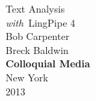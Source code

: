 \cleardoublepage
\pagestyle{empty}
\vspace*{1in}
\begin{center}
{\hfill \fontsize{45}{65}\selectfont Text Analysis \\[18pt] \hfill {\fontsize{30}{45}\it with}\  LingPipe 4}
\\[1in]
{\hfill\Huge Bob Carpenter}
\\[12pt]
{\hfill\Huge Breck Baldwin}
\\[-1pt]
\vfill
{\hfill \large\bf Colloquial Media}
\\[1pt]
{\hfill \small New York}
\\[-1pt]
{\hfill \small 2013}
\end{center}
